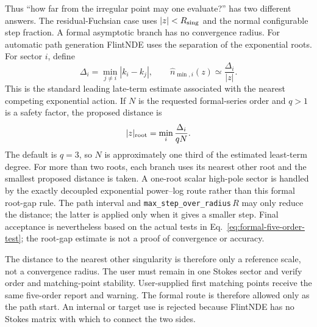 \documentclass[11pt]{article}
\begin{document}
Thus ``how far from the irregular point may one evaluate?'' has two different answers.  The
residual-Fuchsian case uses $|z|<R_{\rm sing}$ and the normal configurable step fraction.  A
formal asymptotic branch has no convergence radius.  For automatic path generation FlintNDE
uses the separation of the exponential roots.  For sector $i$, define
\begin{equation}
 \Delta_i=\min_{j\ne i}|k_i-k_j|,
 \qquad
 \widehat n_{\min,i}(z)\simeq\frac{\Delta_i}{|z|}.
 \label{eq:formal-root-gap-estimate}
\end{equation}
This is the standard leading late-term estimate associated with the nearest competing
exponential action.  If $N$ is the requested formal-series order and $q>1$ is a safety factor,
the proposed distance is
\begin{equation}
 |z|_{\rm root}=\min_i\frac{\Delta_i}{qN}.
 \label{eq:formal-pilot-point}
\end{equation}
The default is $q=3$, so $N$ is approximately one third of the estimated least-term degree.  For more
than two roots, each branch uses its nearest other root and the smallest proposed distance is
taken.  A one-root scalar high-pole sector is handled by the exactly decoupled exponential
power--log route rather than this formal root-gap rule.  The path interval and
\texttt{max\_step\_over\_radius}$\,R$ may only reduce the distance; the latter is applied only
when it gives a smaller step.  Final acceptance is nevertheless based on the actual tests in
Eq.~\eqref{eq:formal-five-order-test}; the root-gap estimate is not a proof of convergence or
accuracy.

The distance to the nearest other singularity is therefore only a reference scale, not a
convergence radius.  The user must remain in one Stokes sector and verify order and
matching-point stability.  User-supplied first matching points receive the same five-order
report and warning.  The
formal route is therefore allowed only as the path start.  An internal or target use is
rejected because FlintNDE has no Stokes matrix with which to connect the two sides.
\end{document}
